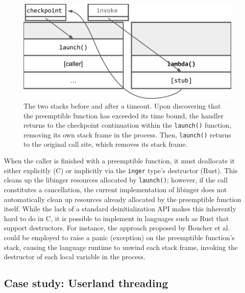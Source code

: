 \begin{figure}
\includegraphics[width=\columnwidth]{figs/twostacks}
\caption{The two stacks before and after a timeout.  \textnormal{Upon discovering
that the preemptible function has exceeded its time bound, the handler returns to the
checkpoint continuation within the \texttt{launch()} function, removing its own stack
frame in the process.  Then, \texttt{launch()} returns to the original call site,
which removes its stack frame.}}
\label{fig:twostacks}
\end{figure}

When the caller is finished with a preemptible function, it must deallocate it either
explicitly (C) or implicitly via the \texttt{inger} type's destructor (Rust).  This
cleans up the libinger resources allocated by \texttt{launch()}; however, if the call
constitutes a cancellation, the current implementation of libinger does not
automatically clean up resources already allocated by the preemptible function
itself.  While the lack of a standard deinitialization API makes this inherently hard
to do in C, it is possible to implement in languages such as Rust that support
destructors.  For instance, the approach proposed by Boucher et
al.~\cite{boucher:atc2018} could be employed to raise a panic (exception) on the
preemptible function's stack, causing the language runtime to unwind each stack frame,
invoking the destructor of each local variable in the process.

\subsection{Case study: Userland threading}
\label{sec:threading}
